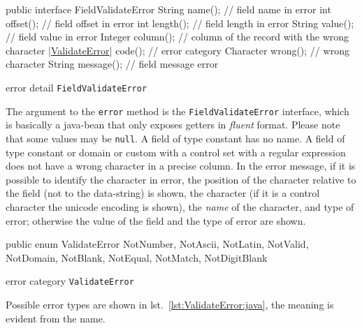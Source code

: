 \begin{elisting}[!htb]
\begin{javacode}
public interface FieldValidateError {
    String name();          // field name in error
    int offset();           // field offset in error
    int length();           // field length in error
    String value();         // field value in error
    Integer column();       // column of the record with the wrong character
    |\hyperref[lst:ValidateError:java]{ValidateError}| code();   // error category
    Character wrong();      // wrong character
    String message();       // field message error
}
\end{javacode}
\caption{error detail \texttt{FieldValidateError}}
\label{lst:FieldValidateError:java}
\end{elisting}

The argument to the \texttt{error} method is the \texttt{FieldValidateError} 
interface, which is basically a java-bean that only exposes getters in 
\textit{fluent} format. 
Please note that some values may be \texttt{null}. A field of type constant has 
no name. A field of type constant or domain or custom with a control set with a 
regular expression does not have a wrong character in a precise column. 
In the error message, if it is possible to identify the character in error, the 
position of the character relative to the field (not to the data-string) is 
shown, the character (if it is a control character the unicode encoding is 
shown), the \textit{name} of the character, and type of error; otherwise the 
value of the field and the type of error are shown.

\begin{elisting}[!htb]
\begin{javacode}
public enum ValidateError {
    NotNumber, NotAscii, NotLatin, NotValid, NotDomain, NotBlank, NotEqual, NotMatch, NotDigitBlank
}
\end{javacode}
\caption{error category \texttt{ValidateError}}
\label{lst:ValidateError:java}
\end{elisting}

Possible error types are shown in lst.~\ref{lst:ValidateError:java}, the meaning 
is evident from the name.

